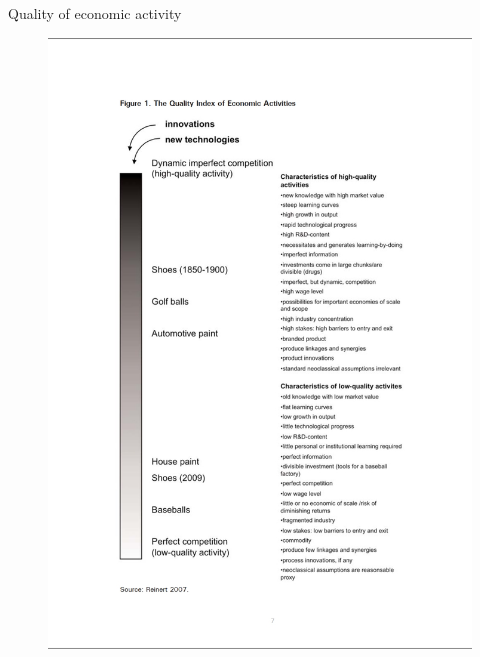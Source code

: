 \documentclass{beamer}
\begin{document}
\begin{frame}{Quality of economic activity}

	\begin{figure}[htpb]
		\centering
		\includegraphics[width=0.5\linewidth]{../img/reinert.jpg}
	\end{figure}

\end{frame}
\end{document}

